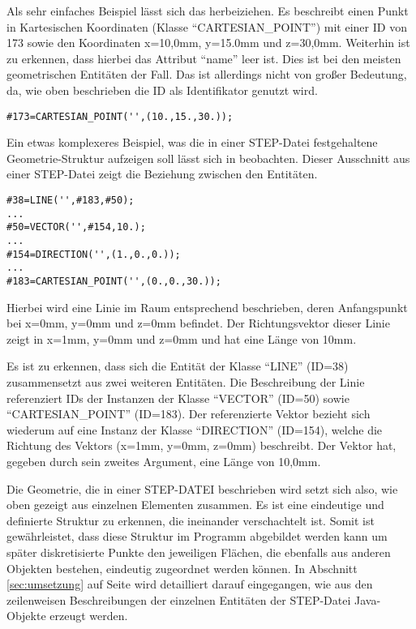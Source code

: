 Als sehr einfaches Beispiel lässt sich das  herbeiziehen. Es beschreibt einen Punkt in Kartesischen Koordinaten (Klasse "`CARTESIAN\_POINT"') mit einer ID von 173 sowie den Koordinaten x=10,0mm, y=15.0mm und z=30,0mm. Weiterhin ist zu erkennen, dass hierbei das Attribut "`name"' leer ist. Dies ist bei den meisten geometrischen Entitäten der Fall. Das ist allerdings nicht von großer Bedeutung, da, wie oben beschrieben die ID als Identifikator genutzt wird.    

\begin{lstlisting}[captionpos=b, style=customc, caption=Beschreibung eines Punktes in STEP, label=lis:simplestp]
#173=CARTESIAN_POINT('',(10.,15.,30.));
\end{lstlisting}

Ein etwas komplexeres Beispiel, was die in einer STEP-Datei festgehaltene Geometrie-Struktur aufzeigen soll lässt sich in  beobachten. Dieser Ausschnitt aus einer STEP-Datei zeigt die Beziehung zwischen den Entitäten. 


\begin{lstlisting}[captionpos=b, style=customc, caption=Beschreibung einer Linie in STEP, label=lis:exmpllinestp]
#38=LINE('',#183,#50);
...
#50=VECTOR('',#154,10.);
...
#154=DIRECTION('',(1.,0.,0.));
...
#183=CARTESIAN_POINT('',(0.,0.,30.));
\end{lstlisting} 

Hierbei wird eine Linie im Raum entsprechend beschrieben, deren Anfangspunkt bei x=0mm, y=0mm und z=0mm befindet. Der Richtungsvektor dieser Linie zeigt in x=1mm, y=0mm und z=0mm und hat eine Länge von 10mm.

Es ist zu erkennen, dass sich die Entität der Klasse "`LINE"' (ID=38) zusammensetzt aus zwei weiteren Entitäten. Die Beschreibung der Linie referenziert IDs der Instanzen der Klasse "`VECTOR"' (ID=50) sowie "`CARTESIAN\_POINT"' (ID=183). Der referenzierte Vektor bezieht sich wiederum auf eine Instanz der Klasse "`DIRECTION"' (ID=154), welche die Richtung des Vektors (x=1mm, y=0mm, z=0mm) beschreibt. Der Vektor hat, gegeben durch sein zweites Argument, eine Länge von 10,0mm.

Die Geometrie, die in einer STEP-DATEI beschrieben wird setzt sich also, wie oben gezeigt aus einzelnen Elementen zusammen. Es ist eine eindeutige und definierte Struktur zu erkennen, die ineinander verschachtelt ist. Somit ist gewährleistet, dass diese Struktur im Programm abgebildet werden kann um später diskretisierte Punkte den jeweiligen Flächen, die ebenfalls aus anderen Objekten bestehen, eindeutig zugeordnet werden können. 
In Abschnitt \ref{sec:umsetzung} auf Seite \pageref{sec:umsetzung} wird detailliert darauf eingegangen, wie aus den zeilenweisen Beschreibungen der einzelnen Entitäten der STEP-Datei Java-Objekte erzeugt werden.              

